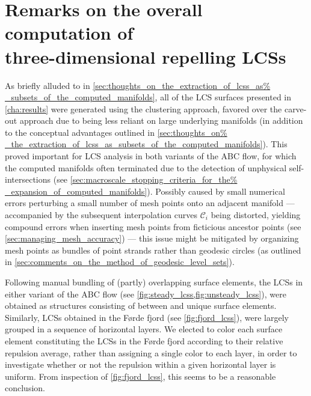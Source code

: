 \section[Remarks on the overall computation of three-dimensional repelling
LCSs]{Remarks on the overall computation of \\\phantom{5.5} three-dimensional
repelling LCSs}
\label{sec:remarks_on_the_overall_computation_of_three_dimensional_repelling_lcss}

As briefly alluded to in \cref{sec:thoughts_on_the_extraction_of_lcss_as%
_subsets_of_the_computed_manifolds}, all of the LCS surfaces presented in
\cref{cha:results} were generated using the clustering approach, favored over
the carve-out approach due to being less reliant on large underlying manifolds
(in addition to the conceptual advantages outlined in \cref{sec:thoughts_on%
_the_extraction_of_lcss_as_subsets_of_the_computed_manifolds}). This proved
important for LCS analysis in both variants of the ABC flow, for which the
computed manifolds often terminated due to the detection of unphysical
self-intersections (see \cref{sec:macroscale_stopping_criteria_for_the%
_expansion_of_computed_manifolds}). Possibly caused by small numerical errors
perturbing a small number of mesh points onto an adjacent manifold ---
accompanied by the subsequent interpolation curves $\mathcal{C}_{i}$ being
distorted, yielding compound errors when inserting mesh points from ficticious
ancestor points (see \cref{sec:managing_mesh_accuracy}) --- this issue might be
mitigated by organizing mesh points as bundles of point strands rather than
geodesic circles (as outlined in
\cref{sec:comments_on_the_method_of_geodesic_level_sets}).

Following manual bundling of (partly) overlapping surface elements, the LCSs in
either variant of the ABC flow (see \cref{fig:steady_lcss,fig:unsteady_lcss}),
were obtained as structures consisting of between  and
 unique surface elements. Similarly, LCSs obtained in the Førde
fjord (see \cref{fig:fjord_lcss}), were largely grouped in a sequence of
horizontal layers. We elected to color each surface element constituting the
LCSs in the Førde fjord according to their relative repulsion average, rather
than assigning a single color to each layer, in order to investigate whether or
not the repulsion within a given horizontal layer is uniform. From inspection
of \cref{fig:fjord_lcss}, this seems to be a reasonable conclusion.

